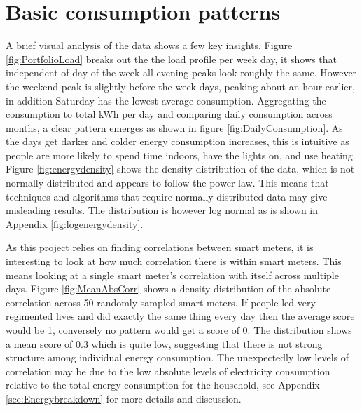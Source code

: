 \FloatBarrier

\section{Basic consumption patterns}
\label{sec:basicconsum}
A brief visual analysis of the data shows a few key insights. Figure \ref{fig:PortfolioLoad} breaks out the the load profile per week day, it shows that independent of day of the week all evening peaks look roughly the same. However the weekend peak is slightly before the week days, peaking about an hour earlier, in addition Saturday has the lowest average consumption. Aggregating the consumption to total kWh per day and comparing daily consumption across months, a clear pattern emerges as shown in figure \ref{fig:DailyConsumption}. As the days get darker and colder energy consumption increases, this is intuitive as people are more likely to spend time indoors, have the lights on, and use heating. Figure \ref{fig:energydensity} shows the density distribution of the data, which is not normally distributed and appears to follow the power law. This means that techniques and algorithms that require normally distributed data may give misleading results. The distribution is however log normal as is shown in Appendix \ref{fig:logenergydensity}.

As this project relies on finding correlations between smart meters, it is interesting to look at how much correlation there is within smart meters. This means looking at a single smart meter's correlation with itself across multiple days. Figure \ref{fig:MeanAbsCorr} shows a density distribution of the absolute correlation across 50 randomly sampled smart meters. If people led very regimented lives and did exactly the same thing every day then the average score would be 1, conversely no pattern would get a score of 0. The distribution shows a mean score of 0.3 which is quite low, suggesting that there is not strong structure among individual energy consumption. The unexpectedly low levels of correlation may be due to the low absolute levels of electricity consumption relative to the total energy consumption for the household, see Appendix \ref{sec:Energybreakdown} for more details and discussion. 



